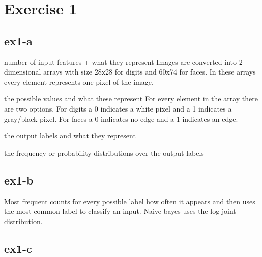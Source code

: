 \section{Exercise 1}
\label{sec:ex1}
\subsection{ex1-a}
number of input features + what they represent \n
Images are converted into 2 dimensional arrays with size 28x28 for digits and 60x74 for faces.
In these arrays every element represents one pixel of the image. 

the possible values and what these represent \n
For every element in the array there are two options. For digits a 0 indicates a white pixel
and a 1 indicates a gray/black pixel. For faces a 0 indicates no edge and a 1 indicates an edge.


the output labels and what they represent \n


the frequency or probability distributions over the output labels \n

\subsection{ex1-b}
Most frequent counts for every possible label how often it appears and then uses the most
common label to classify an input.
Naive bayes uses the log-joint distribution. 

\subsection{ex1-c}